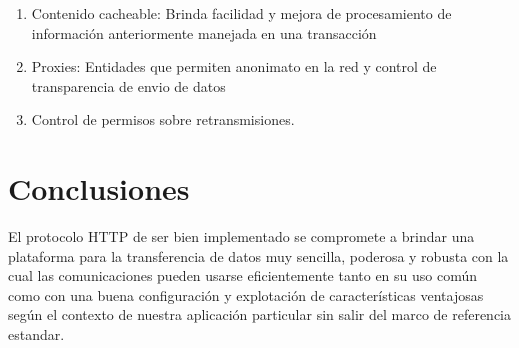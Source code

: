 \documentclass[12pt]{article}
\begin{document}
\begin{enumerate}
\item{Contenido cacheable: Brinda facilidad y mejora de procesamiento de información anteriormente manejada en una transacción}
\item{Proxies: Entidades que permiten anonimato en la red y control de transparencia de envio de datos }
\item{Control de permisos sobre retransmisiones.}
\end{enumerate}




\section{Conclusiones}

El protocolo HTTP de ser bien implementado se compromete a brindar una plataforma para la transferencia de datos muy sencilla, poderosa y robusta con la cual
las comunicaciones pueden usarse eficientemente tanto en su uso común como con una buena configuración y explotación de características ventajosas según el contexto
de nuestra aplicación particular sin salir del marco de referencia estandar.
\end{document}
